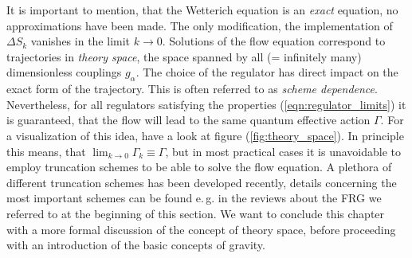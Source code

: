 It is important to mention, that the Wetterich equation is an \textit{exact} equation, no approximations have been made. The only modification, the implementation of $\Delta S_k$ vanishes in the limit $k\rightarrow 0$. Solutions of the flow equation correspond to trajectories in \textit{theory space}, the space spanned by all (= infinitely many) dimensionless couplings $g_{\alpha}$. The choice of the regulator has direct impact on the exact form of the trajectory. This is often referred to as \textit{scheme dependence}. Nevertheless, for all regulators satisfying the properties (\ref{eqn:regulator_limits}) it is guaranteed, that the flow will lead to the same quantum effective action $\Gamma$. For a visualization of this idea, have a look at figure (\ref{fig:theory_space}).  In principle this means, that $\lim_{k\rightarrow 0}\Gamma_k\equiv\Gamma$, but in most practical cases it is unavoidable to employ truncation schemes to be able to solve the flow equation. A plethora of different truncation schemes has been developed recently, details concerning the most important schemes can be found e.\,g. in the reviews about the FRG we referred to at the beginning of this section. We want to conclude this chapter with a more formal discussion of the concept of theory space, before proceeding with an introduction of the basic concepts of gravity.
